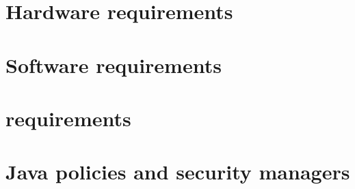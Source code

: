 

\section{Hardware requirements}


\section{Software requirements}


\section{\gdserver requirements}


\section{Java policies and security managers}

